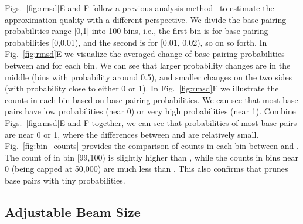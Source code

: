 Figs.~\ref{fig:rmsd}E and F follow a previous analysis method~\cite{Zuber+:2017} to estimate the approximation quality with a different perspective. 
We divide the base pairing probabilities range [0,1] into 100 bins, i.e., the first bin is for base pairing probabilities [0,0.01), and the second is for [0.01, 0.02), so on so forth. 
In Fig.~\ref{fig:rmsd}E we visualize the averaged change of base pairing probabilities between \rnafold and \linearpartition for each bin.
We can see that larger probability changes are in the middle (bins with probability around 0.5),
and smaller changes on the two sides (with probability close to either 0 or 1).
In Fig.~\ref{fig:rmsd}F we illustrate the counts in each bin based on \rnafold base pairing probabilities.
We can see that most base pairs have low probabilities (near 0) or very high probabilities (near 1).
Combine Figs.~\ref{fig:rmsd}E and F together, we can see that probabilities of most base pairs are near 0 or 1, where the differences between \rnafold and \linearpartition are relatively small. 
Fig.~\ref{fig:bin_counts} provides the comparison of counts in each bin between \rnafold and \linearpartitionv. The count of \linearpartitionv in bin [99,100) is slightly higher than \rnafold, 
while the counts in bins near 0 (being capped at 50,000) are much less than \rnafold.
This  also confirms that \linearpartition prunes base pairs with tiny probabilities.



\vspace{-0.4cm}
\subsection{Adjustable Beam Size}

